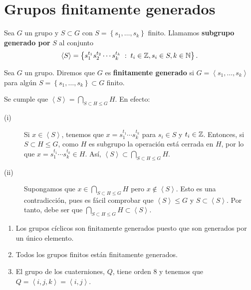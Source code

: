 \section{Grupos finitamente generados}
\begin{definition}
	Sea $\displaystyle G $ un grupo y $\displaystyle S \subset G $ con $\displaystyle S = \left\{ s _{1}, \ldots, s_{k}\right\}  $ finito. Llamamos \textbf{subgrupo generado por} $\displaystyle S $ al conjunto 
	\[\left\langle S \right\rangle = \left\{ s_{1}^{t_{1}}s_{2}^{t_{2}} \cdots s_{k}^{t_{k}} \; : \; t_{i} \in \mathbb{Z}, s_{i} \in S, k \in \mathbb{N}\right\}  .\]
\end{definition}
\begin{definition}
	Sea $\displaystyle G $ un grupo. Diremos que $\displaystyle G $ es \textbf{finitamente generado} si $\displaystyle G = \left\langle s_{1}, \ldots, s_{k} \right\rangle  $ para algún $\displaystyle S = \left\{ s_{1}, \ldots, s_{k}\right\} \subset G $ finito. 
\end{definition}
\begin{observation}
Se cumple que $\displaystyle \left\langle S \right\rangle  = \bigcap_{S \subset H \leq G}H $. En efecto:
\begin{description}
\item[(i)] Si $\displaystyle x \in \left\langle S \right\rangle  $, tenemos que $\displaystyle x = s_{1}^{t_{1}} \cdots s_{k}^{t_{k}} $ para $\displaystyle s_{i} \in S $ y $\displaystyle t_{i} \in \mathbb{Z} $. Entonces, si $\displaystyle S \subset H \leq G $, como $\displaystyle H $ es subgrupo la operación está cerrada en $\displaystyle H $, por lo que $\displaystyle x = s_{1}^{t_{1}} \cdots s_{k}^{t_{k}} \in H $. Así, $\displaystyle \left\langle S \right\rangle \subset \bigcap_{S \subset H \leq G}H $.
\item[(ii)] Supongamos que $\displaystyle x \in \bigcap_{S \subset H \leq G}H $ pero $\displaystyle x \not\in \left\langle S \right\rangle  $. Esto es una contradicción, pues es fácil comprobar que $\displaystyle \left\langle S \right\rangle \leq G $ y $\displaystyle S \subset \left\langle S \right\rangle  $. Por tanto, debe ser que $\displaystyle \bigcap_{S \subset H \leq G}H \subset \left\langle S \right\rangle  $.
\end{description}
\end{observation}
\begin{eg}
\begin{enumerate}
\item Los grupos cíclicos son finitamente generados puesto que son generados por un único elemento. 
\item Todos los grupos finitos están finitamente generados. 
\item El grupo de los cuaterniones, $\displaystyle Q $, tiene orden 8 y tenemos que $\displaystyle Q = \left\langle i, j, k \right\rangle =\left\langle i,j \right\rangle  $. 
\end{enumerate}
\end{eg}

